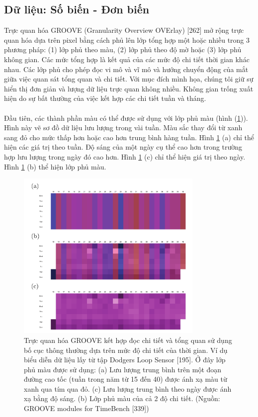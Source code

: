 \subsection{Dữ liệu: Số biến - Đơn biến}
Trực quan hóa GROOVE (Granularity Overview OVErlay) [262] mở rộng trực quan hóa dựa trên pixel bằng cách phủ lên lớp tổng hợp một hoặc nhiều trong 3 phương pháp: (1) lớp phủ theo màu, (2) lớp phủ theo độ mờ hoặc (3) lớp phủ không gian. Các mức tổng hợp là kết quả của các mức độ chi tiết thời gian khác nhau. Các lớp phủ cho phép đọc vi mô và vĩ mô và hướng chuyển động của mắt giữa việc quan sát tổng quan và chi tiết. Với mục đích mình họa, chúng tôi giữ sự hiển thị đơn giản và lượng dữ liệu trực quan không nhiều. Không gian trống xuất hiện do sự bất thường của việc kết hợp các chi tiết tuần và tháng. 
\\ \\
Đầu tiên, các thành phần màu có thể được sử dụng với lớp phủ màu (hình (\ref{fig:f7.5})). Hình này vẽ sơ đồ dữ liệu lưu lượng trong vài tuần. Màu sắc thay đổi từ xanh sang đỏ cho mức thấp hơn hoặc cao hơn trung bình hàng tuần. Hình \ref{fig:f7.5} (a) chỉ thể hiện các giá trị theo tuần. Độ sáng của một ngày cụ thể cao hơn trong trường hợp lưu lượng trong ngày đó cao hơn. Hình \ref{fig:f7.5} (c) chỉ thể hiện giá trị theo ngày. Hình \ref{fig:f7.5} (b) thể hiện lớp phủ màu.
\begin{figure}[H] %
    \centering %
    \includegraphics[width=0.8\textwidth]{assets/fig_7_5.png} 
    \caption{Trực quan hóa GROOVE kết hợp đọc chi tiết và tổng quan sử dụng bố cục thông thường dựa trên mức độ chi tiết của thời gian. Ví dụ biểu diễn dữ liệu lấy từ tập Dodgers Loop Sensor [195]. Ở đây lớp phủ màu được sử dụng: (a) Lưu lượng trung bình trên một đoạn đường cao tốc (tuần trong năm từ 15 đến 40) được ánh xạ màu từ xanh qua tím qua đỏ. (c) Lưu lượng trung bình theo ngày được ánh xạ bằng độ sáng. (b) Lớp phủ màu của cả 2 độ chi tiết. (Nguồn: GROOVE modules for TimeBench [339])} %
    \label{fig:f7.5}
\end{figure}
